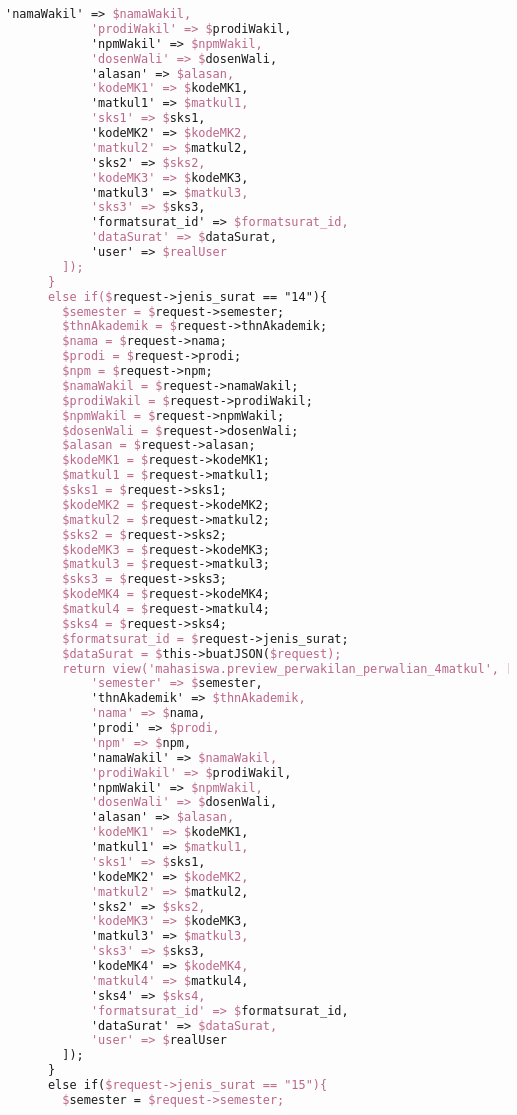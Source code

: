 \begin{lstlisting}[language=tex,basicstyle=\tiny,caption=PesanansuratController.php]
            'namaWakil' => $namaWakil,
            'prodiWakil' => $prodiWakil,
            'npmWakil' => $npmWakil,
            'dosenWali' => $dosenWali,
            'alasan' => $alasan,
            'kodeMK1' => $kodeMK1,
            'matkul1' => $matkul1,
            'sks1' => $sks1,
            'kodeMK2' => $kodeMK2,
            'matkul2' => $matkul2,
            'sks2' => $sks2,
            'kodeMK3' => $kodeMK3,
            'matkul3' => $matkul3,
            'sks3' => $sks3,
            'formatsurat_id' => $formatsurat_id,
            'dataSurat' => $dataSurat,
            'user' => $realUser
        ]);
      }
      else if($request->jenis_surat == "14"){
        $semester = $request->semester;
        $thnAkademik = $request->thnAkademik;
        $nama = $request->nama;
        $prodi = $request->prodi;
        $npm = $request->npm;
        $namaWakil = $request->namaWakil;
        $prodiWakil = $request->prodiWakil;
        $npmWakil = $request->npmWakil;
        $dosenWali = $request->dosenWali;
        $alasan = $request->alasan;
        $kodeMK1 = $request->kodeMK1;
        $matkul1 = $request->matkul1;
        $sks1 = $request->sks1;
        $kodeMK2 = $request->kodeMK2;
        $matkul2 = $request->matkul2;
        $sks2 = $request->sks2;
        $kodeMK3 = $request->kodeMK3;
        $matkul3 = $request->matkul3;
        $sks3 = $request->sks3;
        $kodeMK4 = $request->kodeMK4;
        $matkul4 = $request->matkul4;
        $sks4 = $request->sks4;
        $formatsurat_id = $request->jenis_surat;
        $dataSurat = $this->buatJSON($request);
        return view('mahasiswa.preview_perwakilan_perwalian_4matkul', [
            'semester' => $semester,
            'thnAkademik' => $thnAkademik,
            'nama' => $nama,
            'prodi' => $prodi,
            'npm' => $npm,
            'namaWakil' => $namaWakil,
            'prodiWakil' => $prodiWakil,
            'npmWakil' => $npmWakil,
            'dosenWali' => $dosenWali,
            'alasan' => $alasan,
            'kodeMK1' => $kodeMK1,
            'matkul1' => $matkul1,
            'sks1' => $sks1,
            'kodeMK2' => $kodeMK2,
            'matkul2' => $matkul2,
            'sks2' => $sks2,
            'kodeMK3' => $kodeMK3,
            'matkul3' => $matkul3,
            'sks3' => $sks3,
            'kodeMK4' => $kodeMK4,
            'matkul4' => $matkul4,
            'sks4' => $sks4,
            'formatsurat_id' => $formatsurat_id,
            'dataSurat' => $dataSurat,
            'user' => $realUser
        ]);
      }
      else if($request->jenis_surat == "15"){
        $semester = $request->semester;

\end{lstlisting}
